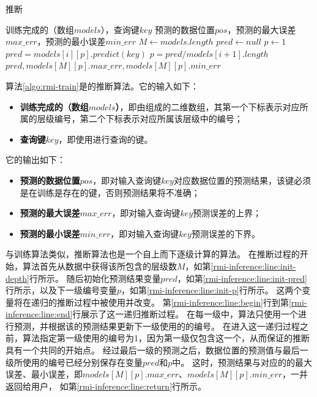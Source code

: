 \begin{algorithm}
\caption{{\rmi}推断}
\label{algo:rmi-inference}
\begin{algorithmic}[1] %
\Require 训练完成的{\rmi}（{\model}数组$models$），查询键$key$ %
\Ensure 预测的数据位置$pos$，预测的最大误差$max\_err$，预测的最小误差$min\_err$ %
\State $M \gets models.length$
\label{rmi-inference:line:init-depth}
\State $pred \gets null$
\label{rmi-inference:line:init-pred}
\State $p \gets 1$
\label{rmi-inference:line:init-p}
\label{rmi-inference:line:begin}
  \State $pred = models[i][p].predict(key)$
  \State $p = pred / models[i+1].length$
\EndFor
\label{rmi-inference:line:end}
\State \Return $pred, models[M][p].max\_err, models[M][p].min\_err$
\label{rmi-inference:line:return}
\end{algorithmic}
\end{algorithm}

算法\ref{algo:rmi-train}是{\rmi}的推断算法。它的输入如下：
\begin{itemize}
  \item \textbf{训练完成的{\rmi}（{\model}数组$models$）}，即由{\model}组成的二维数组，其第一个下标表示对应{\model}所属的层级编号，第二个下标表示对应{\model}所属该层级中的{\model}编号；
  \item \textbf{查询键$key$}，即使用{\rmi}进行查询的键。
\end{itemize}
它的输出如下：
\begin{itemize}
  \item \textbf{预测的数据位置$pos$}，即{\rmi}对输入查询键$key$对应数据位置的预测结果，该键必须是在训练是存在的键，否则预测结果将不准确；
  \item \textbf{预测的最大误差$max\_err$}，即{\rmi}对输入查询键$key$预测误差的上界；
  \item \textbf{预测的最小误差$min\_err$}，即{\rmi}对输入查询键$key$预测误差的下界。
\end{itemize}

与{\rmi}训练算法类似，{\rmi}推断算法也是一个自上而下逐级计算的算法。
在推断过程的开始，算法首先从{\model}数据中获得该{\rmi}所包含的层级数$M$，如第\ref{rmi-inference:line:init-depth}行所示。
随后初始化预测结果变量$pred$，如第\ref{rmi-inference:line:init-pred}行所示，以及下一级{\model}编号变量$p$，如第\ref{rmi-inference:line:init-p}行所示。
这两个变量将在递归的推断过程中被使用并改变。
第\ref{rmi-inference:line:begin}行到第\ref{rmi-inference:line:end}行展示了这一递归推断过程。
在每一级中，算法只使用一个{\model}进行预测，并根据该{\model}的预测结果更新下一级使用的{\model}的编号。
在进入这一递归过程之前，算法指定第一级使用的{\model}编号为1，因为第一级仅包含这一个{\model}，从而保证{\rmi}的推断具有一个共同的开始点。
经过最后一级的{\model}预测之后，数据位置的预测值与最后一级所使用的{\model}编号已经分别保存在变量$pred$和$p$中。
这时，预测结果与对应的{\model}的最大误差、最小误差，即$models[M][p].max\_err$、$models[M][p].min\_err$，一并返回给用户，
如第\ref{rmi-inference:line:return}行所示。

